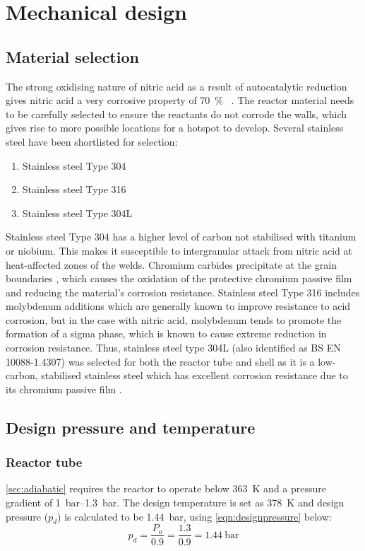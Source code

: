 \section{Mechanical design}
\subsection{Material selection}
The strong oxidising nature of nitric acid as a result of autocatalytic reduction gives nitric acid a very corrosive property of \SI{70}{\percent\wv} \cite{suresh_corrosion_nodate}. The reactor material needs to be carefully selected to ensure the reactants do not corrode the walls, which gives rise to more possible locations for a hotspot to develop. Several stainless steel have been shortlisted for selection: 
\begin{enumerate}
    \item Stainless steel Type 304
    \item Stainless steel Type 316
    \item Stainless steel Type 304L
\end{enumerate}

Stainless steel Type 304 has a higher level of carbon not stabilised with titanium or niobium. This makes it susceptible to intergranular attack from nitric acid at heat-affected zones of the welds. Chromium carbides precipitate at the grain boundaries \cite{cm_selection_nodate}, which causes the oxidation of the protective chromium passive film and reducing the material's corrosion resistance. Stainless steel Type 316 includes molybdenum additions which are generally known to improve resistance to acid corrosion, but in the case with nitric acid, molybdenum tends to promote the formation of a sigma phase, which is known to cause extreme reduction in corrosion resistance. Thus, stainless steel type 304L (also identified as BS EN 10088-1.4307) was selected for both the reactor tube and shell as it is a low-carbon, stabilised stainless steel which has excellent corrosion resistance due to its chromium passive film \cite{ningshen_corrosion_2011}.

\subsection{Design pressure and temperature}
\subsubsection{Reactor tube}
\cref{sec:adiabatic} requires the reactor to operate below \SI{363}{\K} and a pressure gradient of \SIrange{1}{1.3}{\bar}. The design temperature is set as \SI{378}{\K} and design pressure ($p_d$) is calculated to be \SI{1.44}{\bar}, using \cref{eqn:designpressure} below:
\begin{equation}
    p_d = \frac{P_o}{0.9} = \frac{1.3}{0.9} = \SI{1.44}{\bar}
    \label{eqn:designpressure}
\end{equation}


